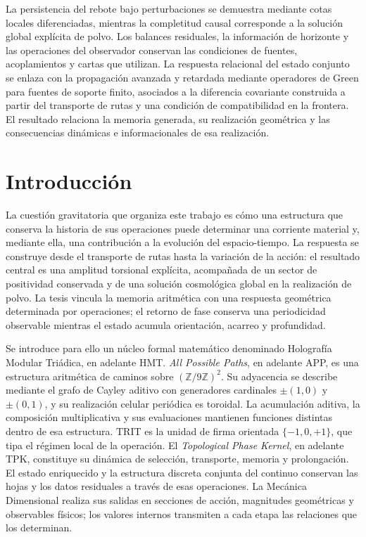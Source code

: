 La persistencia del rebote bajo perturbaciones se demuestra mediante
cotas locales diferenciadas, mientras la completitud causal corresponde
a la solución global explícita de polvo. Los balances residuales, la
información de horizonte y las operaciones del observador conservan las
condiciones de fuentes, acoplamientos y cartas que utilizan. La respuesta
relacional del estado conjunto se enlaza con la propagación avanzada y
retardada mediante operadores de Green para fuentes de soporte finito,
asociados a la diferencia covariante
construida a partir del transporte de rutas y una condición de
compatibilidad en la frontera. El resultado relaciona la memoria
generada, su realización geométrica y las consecuencias dinámicas e
informacionales de esa realización.
\par\endgroup
\clearpage

\section{Introducción}
\label{vii:sec:introduccion}

La cuestión gravitatoria que organiza este trabajo es cómo una estructura
que conserva la historia de sus operaciones puede determinar una
corriente material y, mediante ella, una contribución a la evolución del
espacio-tiempo. La respuesta se construye desde el transporte de rutas
hasta la variación de la acción: el resultado central es una amplitud
torsional explícita, acompañada de un sector de positividad conservada y
de una solución cosmológica global en la realización de polvo. La tesis
vincula la memoria aritmética con una respuesta geométrica determinada por
operaciones; el retorno de fase conserva una periodicidad observable
mientras el estado acumula orientación, acarreo y profundidad.

Se introduce para ello un núcleo formal matemático denominado Holografía
Modular Triádica, en adelante HMT. \emph{All Possible Paths}, en adelante
APP, es una estructura aritmética de caminos sobre
\((\mathbb Z/9\mathbb Z)^2\). Su adyacencia se describe mediante el grafo
de Cayley aditivo con generadores cardinales \(\pm(1,0)\) y
\(\pm(0,1)\), y su realización celular periódica es toroidal. La acumulación
aditiva, la composición multiplicativa y sus evaluaciones mantienen
funciones distintas dentro de esa estructura. TRIT es la unidad de firma
orientada \(\{-1,0,+1\}\), que tipa el régimen local de la operación.
El \emph{Topological Phase Kernel}, en adelante TPK, constituye su
dinámica de selección, transporte, memoria y prolongación. El estado
enriquecido y la estructura discreta conjunta del continuo conservan las
hojas y los datos residuales a través de esas operaciones. La Mecánica
Dimensional realiza sus salidas en secciones de acción, magnitudes
geométricas y observables físicos; los valores internos transmiten a
cada etapa las relaciones que los determinan.


